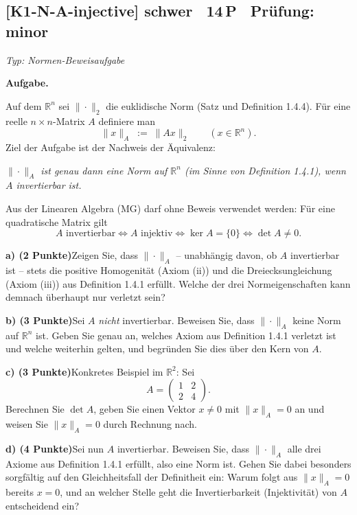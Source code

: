 \documentclass[a4paper,11pt]{article}
\begin{document}
\subsection*{[K1-N-A-injective] \normalfont schwer \textbullet\ 14\,P \textbullet\ Pr\"ufung: minor}
\textit{Typ: Normen-Beweisaufgabe}\par\smallskip
\textbf{Aufgabe.}\par
Auf dem $\mathbb{R}^n$ sei $\|\cdot\|_2$ die euklidische Norm (Satz und Definition 1.4.4). Für eine reelle $n\times n$-Matrix $A$ definiere man
\[
\|x\|_A \;:=\; \|Ax\|_2 \qquad (x\in\mathbb{R}^n).
\]
Ziel der Aufgabe ist der Nachweis der Äquivalenz:
\begin{center}
\emph{$\|\cdot\|_A$ ist genau dann eine Norm auf $\mathbb{R}^n$ (im Sinne von Definition 1.4.1), wenn $A$ invertierbar ist.}
\end{center}
Aus der Linearen Algebra (MG) darf ohne Beweis verwendet werden: Für eine quadratische Matrix gilt
\[
A \text{ invertierbar} \iff A \text{ injektiv} \iff \ker A=\{0\} \iff \det A\neq 0.
\]

\medskip
\textbf{a) (2 Punkte)}\quad Zeigen Sie, dass $\|\cdot\|_A$ -- unabhängig davon, ob $A$ invertierbar ist -- stets die positive Homogenität (Axiom (ii)) und die Dreiecksungleichung (Axiom (iii)) aus Definition 1.4.1 erfüllt. Welche der drei Normeigenschaften kann demnach überhaupt nur verletzt sein?

\medskip
\textbf{b) (3 Punkte)}\quad Sei $A$ \emph{nicht} invertierbar. Beweisen Sie, dass $\|\cdot\|_A$ keine Norm auf $\mathbb{R}^n$ ist. Geben Sie genau an, welches Axiom aus Definition 1.4.1 verletzt ist und welche weiterhin gelten, und begründen Sie dies über den Kern von $A$.

\medskip
\textbf{c) (3 Punkte)}\quad Konkretes Beispiel im $\mathbb{R}^2$: Sei
\[
A=\begin{pmatrix}1&2\\[2pt]2&4\end{pmatrix}.
\]
Berechnen Sie $\det A$, geben Sie einen Vektor $x\neq 0$ mit $\|x\|_A=0$ an und weisen Sie $\|x\|_A=0$ durch Rechnung nach.

\medskip
\textbf{d) (4 Punkte)}\quad Sei nun $A$ invertierbar. Beweisen Sie, dass $\|\cdot\|_A$ alle drei Axiome aus Definition 1.4.1 erfüllt, also eine Norm ist. Gehen Sie dabei besonders sorgfältig auf den Gleichheitsfall der Definitheit ein: Warum folgt aus $\|x\|_A=0$ bereits $x=0$, und an welcher Stelle geht die Invertierbarkeit (Injektivität) von $A$ entscheidend ein?
\end{document}
